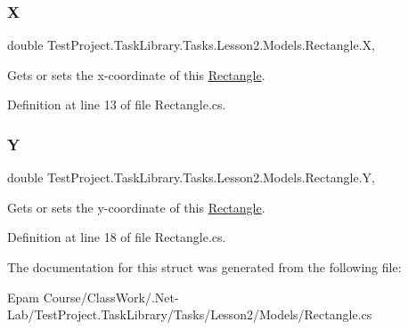 \subsubsection{\texorpdfstring{X}{X}}
{\footnotesize\ttfamily double Test\+Project.\+Task\+Library.\+Tasks.\+Lesson2.\+Models.\+Rectangle.\+X\hspace{0.3cm}{\ttfamily [get]}, {\ttfamily [set]}}



Gets or sets the x-\/coordinate of this \mbox{\hyperlink{struct_test_project_1_1_task_library_1_1_tasks_1_1_lesson2_1_1_models_1_1_rectangle}{Rectangle}}. 



Definition at line 13 of file Rectangle.\+cs.

\mbox{\label{struct_test_project_1_1_task_library_1_1_tasks_1_1_lesson2_1_1_models_1_1_rectangle_a0f43578146610d7c2f80562ac8a65c18}} 
\subsubsection{\texorpdfstring{Y}{Y}}
{\footnotesize\ttfamily double Test\+Project.\+Task\+Library.\+Tasks.\+Lesson2.\+Models.\+Rectangle.\+Y\hspace{0.3cm}{\ttfamily [get]}, {\ttfamily [set]}}



Gets or sets the y-\/coordinate of this \mbox{\hyperlink{struct_test_project_1_1_task_library_1_1_tasks_1_1_lesson2_1_1_models_1_1_rectangle}{Rectangle}}. 



Definition at line 18 of file Rectangle.\+cs.



The documentation for this struct was generated from the following file\+:\begin{DoxyCompactItemize}
\item 
Epam Course/\+Class\+Work/.\+Net-\/\+Lab/\+Test\+Project.\+Task\+Library/\+Tasks/\+Lesson2/\+Models/Rectangle.\+cs\end{DoxyCompactItemize}
